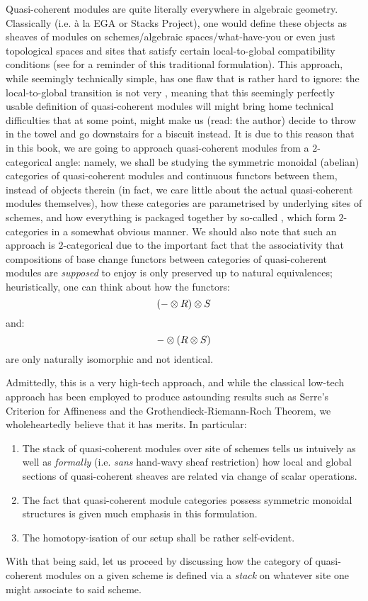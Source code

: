         Quasi-coherent modules are quite literally everywhere in algebraic geometry. Classically (i.e. \`a la EGA or Stacks Project), one would define these objects as sheaves of modules on schemes/algebraic spaces/what-have-you or even just topological spaces and sites that satisfy certain local-to-global compatibility conditions (see \cite[\href{https://stacks.math.columbia.edu/tag/01BD}{Tag 01BD}]{stacks} for a reminder of this traditional formulation). This approach, while seemingly technically simple, has one flaw that is rather hard to ignore: the local-to-global transition is not very , meaning that this seemingly perfectly usable definition of quasi-coherent modules will might bring home technical difficulties that at some point, might make us (read: the author) decide to throw in the towel and go downstairs for a biscuit instead. It is due to this reason that in this book, we are going to approach quasi-coherent modules from a $2$-categorical angle: namely, we shall be studying the symmetric monoidal (abelian) categories of quasi-coherent modules and continuous functors between them, instead of objects therein (in fact, we care little about the actual quasi-coherent modules themselves), how these categories are parametrised by underlying sites of schemes, and how everything is packaged together by so-called , which form $2$-categories in a somewhat obvious manner. We should also note that such an approach is $2$-categorical due to the important fact that the associativity that compositions of base change functors between categories of quasi-coherent modules are \textit{supposed} to enjoy is only preserved up to natural equivalences; heuristically, one can think about how the functors:
            $$(- \tensor R) \tensor S$$
        and:
            $$- \tensor (R \tensor S)$$
        are only naturally isomorphic and not identical. 
        
        Admittedly, this is a very high-tech approach, and while the classical low-tech approach has been employed to produce astounding results such as Serre's Criterion for Affineness and the Grothendieck-Riemann-Roch Theorem, we wholeheartedly believe that it has merits. In particular:
            \begin{enumerate}
                \item The stack of quasi-coherent modules over site of schemes tells us intuively as well as \textit{formally} (i.e. \textit{sans} hand-wavy sheaf restriction) how local and global sections of quasi-coherent sheaves are related via change of scalar operations. 
                \item The fact that quasi-coherent module categories possess symmetric monoidal structures is given much emphasis in this formulation.
                \item The homotopy-isation of our setup shall be rather self-evident.
            \end{enumerate}
        With that being said, let us proceed by discussing how the category of quasi-coherent modules on a given scheme is defined via a \textit{stack} on whatever site one might associate to said scheme.
    

